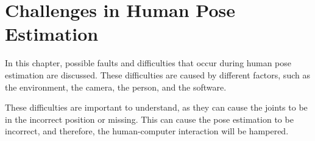 \section{Challenges in Human Pose Estimation}
\label{sec:errors}
In this chapter, possible faults and difficulties that occur during human pose estimation are discussed. These difficulties are caused by different factors, such as the environment, the camera, the person, and the software. 

These difficulties are important to understand, as they can cause the joints to be in the incorrect position or missing. This can cause the pose estimation to be incorrect, and therefore, the human-computer interaction will be hampered.



